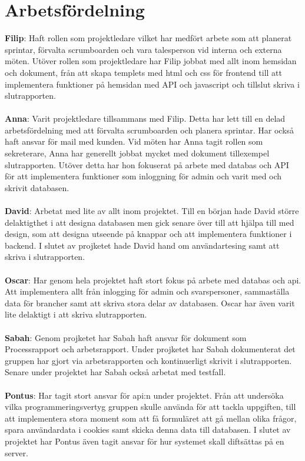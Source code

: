 \documentclass[12pt]{article}
\begin{document}
\section{Arbetsfördelning}
\textbf{Filip}: Haft rollen som projektledare vilket har medfört arbete som att planerat sprintar, förvalta scrumboarden och vara talesperson vid interna och externa möten. Utöver rollen som projektledare har Filip jobbat med allt inom hemsidan och dokument, från att skapa templets med html och css för frontend till att implementera funktioner på hemsidan med API och javascript och tillslut skriva i slutrapporten.\\\\
\textbf{Anna}: Varit projektledare tillsammans med Filip. Detta har lett till en delad arbetsfördelning med att förvalta scrumboarden och planera sprintar. Har också haft ansvar för mail med kunden. Vid möten har Anna tagit rollen som sekreterare, Anna har generellt jobbat mycket med dokument tillexempel slutrapporten. Utöver detta har hon fokuserat på arbete med databas och API för att implementera funktioner som inloggning för admin  och varit med och skrivit databasen.\\\\
\textbf{David}: Arbetat med lite av allt inom projektet. Till en början hade David större delaktigthet i att designa databasen men gick senare över till att hjälpa till med design, som att designa utseende på knappar och att implementera funktioner i backend. I slutet av projketet hade David hand om användartesing samt att skriva i slutrapporten.\\\\
\textbf{Oscar}: Har genom hela projektet haft stort fokus på arbete med databas och api. Att implementera allt från inlogging för admin och svarspersoner, sammaställa data för brancher samt att skriva stora delar av databasen. Oscar har även varit lite delaktigt i att skriva slutrapporten.\\\\
\textbf{Sabah}: Genom projketet har Sabah haft ansvar för dokument som Processrapport och arbetsrapport. Under projketet har Sabah dokumenterat det gruppen har gjort via arbetsrapporten och kontinuerligt skrivit i slutrapporten. Senare under projektet har Sabah också arbetat med testfall.\\\\
\textbf{Pontus}: Har tagit stort ansvar för api:n under projektet. Från att undersöka vilka programmeringsvertyg gruppen skulle använda för att tackla uppgiften, till att implementera stora moment som att få formuläret att gå mellan olika frågor, spara användardata i cookies samt skicka denna data till databasen. I slutet av projektet har Pontus även tagit ansvar för hur  systemet skall diftsättas på en server.\\\\
\end{document}
